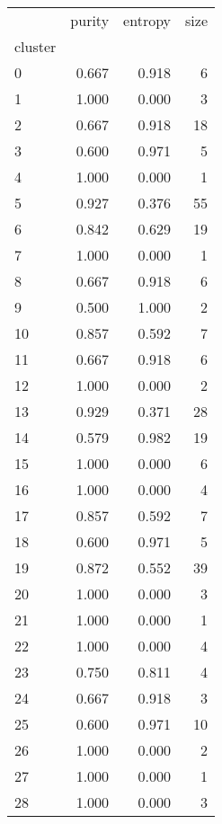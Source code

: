 \begin{tabular}{lrrr}
\toprule
{} &  purity &  entropy &  size \\
cluster &         &          &       \\
\midrule
0       &   0.667 &    0.918 &     6 \\
1       &   1.000 &   0.000 &     3 \\
2       &   0.667 &    0.918 &    18 \\
3       &   0.600 &    0.971 &     5 \\
4       &   1.000 &   0.000 &     1 \\
5       &   0.927 &    0.376 &    55 \\
6       &   0.842 &    0.629 &    19 \\
7       &   1.000 &   0.000 &     1 \\
8       &   0.667 &    0.918 &     6 \\
9       &   0.500 &    1.000 &     2 \\
10      &   0.857 &    0.592 &     7 \\
11      &   0.667 &    0.918 &     6 \\
12      &   1.000 &   0.000 &     2 \\
13      &   0.929 &    0.371 &    28 \\
14      &   0.579 &    0.982 &    19 \\
15      &   1.000 &   0.000 &     6 \\
16      &   1.000 &   0.000 &     4 \\
17      &   0.857 &    0.592 &     7 \\
18      &   0.600 &    0.971 &     5 \\
19      &   0.872 &    0.552 &    39 \\
20      &   1.000 &   0.000 &     3 \\
21      &   1.000 &   0.000 &     1 \\
22      &   1.000 &   0.000 &     4 \\
23      &   0.750 &    0.811 &     4 \\
24      &   0.667 &    0.918 &     3 \\
25      &   0.600 &    0.971 &    10 \\
26      &   1.000 &   0.000 &     2 \\
27      &   1.000 &   0.000 &     1 \\
28      &   1.000 &   0.000 &     3 \\
\bottomrule
\end{tabular}
